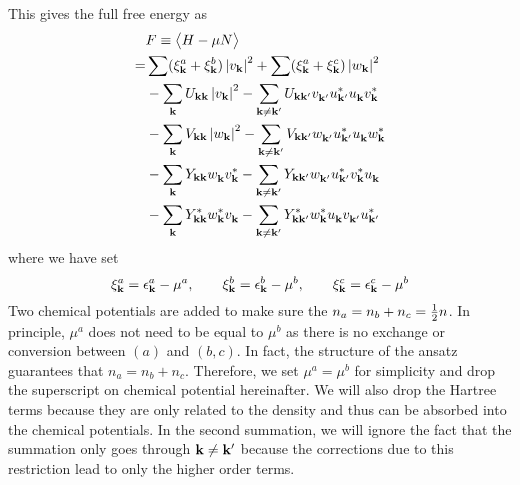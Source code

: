 This gives the full free energy as 
\begin{equation}\label{eq:uvw:F}
 \begin{split}
  &F\equiv\bigl<{H-\mu{}N}\bigr>\\
    =&\sum(\xi^a_{\mathbf{k}}+\xi^b_{\mathbf{k}})\left\lvert{v_{\ensuremath{\mathbf{k}}}}\right\rvert^2+\sum(\xi^a_{\mathbf{k}}+\xi^c_{\mathbf{k}})\left\lvert{w_{\ensuremath{\mathbf{k}}}}\right\rvert^2\\
    &-\sum_{\mathbf{k}}U_{\mathbf{k}\mathbf{k}}\left\lvert{v_{\ensuremath{\mathbf{k}}}}\right\rvert^2-\sum_{\mathbf{k}\neq\mathbf{k}'}U_{\mathbf{k}\mathbf{k}'}v^{}_{\mathbf{k}'}u^*_{\mathbf{k}'}u^{}_{\mathbf{k}}{}v^*_{\mathbf{k}}\\
    &-\sum_{\mathbf{k}}V_{\mathbf{k}\mathbf{k}}\left\lvert{w_{\ensuremath{\mathbf{k}}}}\right\rvert^2
      -\sum_{\mathbf{k}\neq\mathbf{k}'}V_{\mathbf{k}\mathbf{k}'}w^{}_{\mathbf{k}'}u^*_{\mathbf{k}'}u^{}_{\mathbf{k}}{}w^*_{\mathbf{k}}\\
    &-\sum_{\mathbf{k}}Y_{\mathbf{k}\mathbf{k}}w^{}_{\mathbf{k}}v^*_{\mathbf{k}}{}
      -\sum_{\mathbf{k}\neq\mathbf{k}'}Y_{\mathbf{k}\mathbf{k}'}w^{}_{\mathbf{k}'}{u^{*}_{\mathbf{k}'}}v^*_{\mathbf{k}}{}u^{}_{\mathbf{k}}\\
    &-\sum_{\mathbf{k}}Y^*_{\mathbf{k}\mathbf{k}}w^*_{\mathbf{k}}v^{}_{\mathbf{k}}{}
      -\sum_{\mathbf{k}\neq\mathbf{k}'}Y^*_{\mathbf{k}\mathbf{k}'}w^*_{\mathbf{k}}{u^{}_{\mathbf{k}}}v^{}_{\mathbf{k}'}{}u^{*}_{\mathbf{k}'}
 \end{split}
\end{equation}
where we have set
\begin{equation*}
 \xi^a_{\mathbf{k}}=\epsilon^a_{\mathbf{k}}-\mu^a,\qquad\xi^b_{\mathbf{k}}=\epsilon^b_{\mathbf{k}}-\mu^b,\qquad\xi^c_{\mathbf{k}}=\epsilon^c_{\mathbf{k}}-\mu^b
\end{equation*}
 Two chemical potentials are added to make sure the $n_a=n_b+n_c=\frac{1}{2}n$.  In principle, $\mu^{a}$ does not need to be equal to $\mu^{b}$  as there is no exchange or conversion between $(a)$ and $(b,c)$.  In fact, the structure of the ansatz guarantees that $n_a=n_b+n_c$. Therefore, we set $\mu^{a}=\mu^{b}$ for simplicity and drop the superscript on chemical potential hereinafter. 
We will also drop the Hartree terms because they are  only related to the density and thus can be absorbed into the chemical potentials.   In the second summation, we will ignore the fact that the summation only goes through $\mathbf{k}\neq\mathbf{k}'$ because the corrections due to this restriction lead to only the higher order terms. 
 
